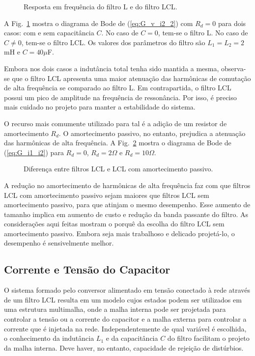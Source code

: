   \begin{figure}[htb]
    \centering{
      \def\svgwidth{\textwidth}
      }
    \caption{Resposta em frequência do filtro L e do filtro LCL.}
    \label{fig:L_vs_LCL}
  \end{figure}

  A Fig.~\ref{fig:L_vs_LCL} mostra o diagrama de Bode de (\ref{eq:G_v_i2_2}) com $R_d = 0$ para dois casos: com e sem capacitância $C$. No caso de $C = 0$, tem-se o filtro L. No caso de $C \neq 0$, tem-se o filtro LCL. Os valores dos parâmetros do filtro são $L_1=L_2=2$mH e $C=40\mu$F.

  Embora nos dois casos a indutância total tenha sido mantida a mesma, observa-se que o filtro LCL apresenta uma maior atenuação das harmônicas de comutação de alta frequência se comparado ao filtro L. Em contrapartida, o filtro LCL possui um pico de amplitude na frequência de ressonância. Por isso, é preciso mais cuidado no projeto para manter a estabilidade do sistema.

  O recurso mais comumente utilizado para tal é a adição de um resistor de amortecimento $R_d$. O amortecimento passivo, no entanto, prejudica a atenuação das harmônicas de alta frequência. A Fig.~\ref{fig:R_in_LCL} mostra o diagrama de Bode de (\ref{eq:G_i1_i2}) para $R_d = 0$, $R_d = 2\Omega$ e $R_d = 10\Omega$.

  \begin{figure}[htb]
    \centering{
      \def\svgwidth{\textwidth}
      }
    \caption{Diferença entre filtros LCL e LCL com amortecimento passivo.}
    \label{fig:R_in_LCL}
  \end{figure}

  A redução no amortecimento de harmônicas de alta frequência faz com que filtros LCL com amortecimento passivo sejam maiores que filtros LCL sem amortecimento passivo, para que atinjam o mesmo desempenho. Esse aumento de tamanho implica em aumento de custo e redução da banda passante do filtro. As considerações aqui feitas mostram o porquê da escolha do filtro LCL sem amortecimento passivo. Embora seja mais trabalhoso e delicado projetá-lo, o desempenho é sensivelmente melhor.


\subsection{Corrente e Tensão do Capacitor}

  O sistema formado pelo conversor alimentado em tensão conectado à rede através de um filtro LCL resulta em um modelo cujos estados podem ser utilizados em uma estrutura multimalha, onde a malha interna pode ser projetada para controlar a tensão ou a corrente do capacitor e a malha externa para controlar a corrente que é injetada na rede. Independentemente de qual variável é escolhida, o conhecimento da indutância $L_1$ e da capacitância $C$ do filtro facilitam o projeto da malha interna. Deve haver, no entanto, capacidade de rejeição de distúrbios.


